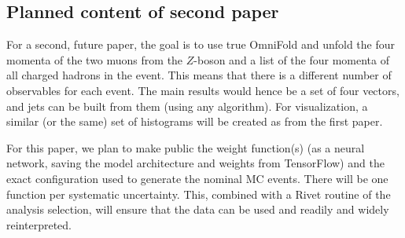 \subsection{Planned content of second paper}
For a second, future paper, the goal is to use true OmniFold and unfold the four momenta of the two muons from the $Z$-boson and a list of the four momenta of all charged hadrons in the event.
This means that there is a different number of observables for each event. The main results would hence be a set of four vectors, and jets can be built from them (using any algorithm).
For visualization, a similar (or the same) set of histograms will be created as from the first paper.

For this paper, we plan to make public the weight function(s) (as a neural network, saving the model architecture and weights from TensorFlow) and the exact configuration used to generate the nominal MC events.  There will be one function per systematic uncertainty.  This, combined with a Rivet routine of the analysis selection, will ensure that the data can be used and readily and widely reinterpreted.
